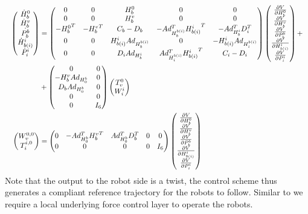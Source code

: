 \documentclass[a4paper,twoside, openright,12pt]{report}
\begin{document}
\begin{eqnarray}
\resizebox{1\hsize}{!}{$
\begin{aligned}
\begin{pmatrix}\dot{H}_b^0 \\ \dot{H}_b^v \\  \dot{P_b^b} \\ \dot{H}_{b(i)}^i \\ \dot{P}_i^i\end{pmatrix}
 &=
\begin{pmatrix} 0 & 0 & H_b^0 & 0 & 0\\ 0 & 0 & H_b^v & 0 & 0 \\
- {H_b^0}^T & -{H_b^v}^T & C_b-D_b & -Ad_{H_b^{b(i)}}^T {H_{b(i)}^i}^T & -Ad_{H_b^i}^T D_i^T \\
0 & 0 & H_{b(i)}^i Ad_{H_b^{b(i)}} & 0 & -H_{b(i)}^i Ad_{H_i^{b(i)}} \\ 0 & 0 & D_i Ad_{H_b^i} & Ad_{H_i^{b(i)}}^T {H_{b(i)}^i}^T & C_i - D_i\end{pmatrix}
\begin{pmatrix}\frac{\partial V}{\partial H_b^0}\\ \frac{\partial V}{\partial H_b^v} \\ \frac{\partial V}{\partial P_b^b} \\ \frac{\partial V}{\partial H_{b(i)}^i} \\ 
\frac{\partial V}{\partial P_{i}^i}\end{pmatrix} + \\
&+
\begin{pmatrix}
0 & 0 \\
-H_b^v Ad_{H_0^b} & 0 \\
D_b Ad_{H_0^b} & 0 \\
0 & 0 \\
0 & I_6
\end{pmatrix}
\begin{pmatrix}
T_v^0 \\ W_i^i
\end{pmatrix}
\\
\begin{pmatrix}
W_v^{0,0} \\ T_i^{i,0}
\end{pmatrix}
&=
\begin{pmatrix}
0 & -Ad_{H_0^b}^T  {H_b^v}^T & Ad_{H_0^b}^T D_b^T & 0 & 0 \\
0 & 0 & 0 & 0 & I_6
\end{pmatrix}
\begin{pmatrix}\frac{\partial V}{\partial H_b^0}\\ \frac{\partial V}{\partial H_b^v} \\ \frac{\partial V}{\partial P_b^b} \\ \frac{\partial V}{\partial H_{b(i)}^i} \\ 
\frac{\partial V}{\partial P_{i}^i}\end{pmatrix}
\end{aligned}
$}
\end{eqnarray}
Note that the output to the robot side is a twist, the control scheme thus generates a compliant reference trajectory for the robots to follow. Similar to \cite{Caccavale_08} we require a local underlying force control layer to operate the robots.
\end{document}
